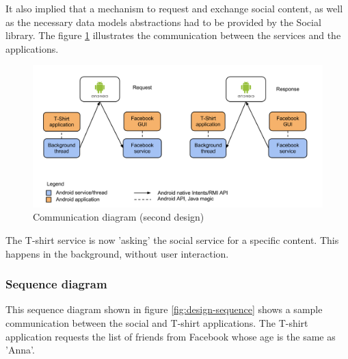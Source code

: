 It also implied that a mechanism to request and exchange social content, as well as the necessary
data models abstractions had to be provided by the Social library. The figure \ref{fig:design-reqresp}
illustrates the communication between the services and the applications.

\begin{figure}[h!]
	\centering \includegraphics[scale=0.35]{img/design-reqresp.png}
	\caption{Communication diagram (second design)}
	\label{fig:design-reqresp}
\end{figure}

The T-shirt service is now 'asking' the social service for a specific content.
This happens in the background, without user interaction.

\subsubsection{Sequence diagram}
This sequence diagram shown in figure \ref{fig:design-sequence} shows a sample communication between the social and T-shirt applications.
The T-shirt application requests the list of friends from Facebook whose age is the same as 'Anna'.

